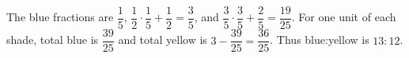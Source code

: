 The blue fractions are $\dfrac{1}{5}$, $\dfrac{1}{2}\cdot\dfrac{1}{5}+\dfrac{1}{2}=\dfrac{3}{5}$, and $\dfrac{3}{5}\cdot\dfrac{3}{5}+\dfrac{2}{5}=\dfrac{19}{25}$. For one unit of each shade, total blue is $\dfrac{39}{25}$ and total yellow is $ 3-\dfrac{39}{25}=\dfrac{36}{25}$. Thus blue:yellow is $\boxed{13:12}$.
